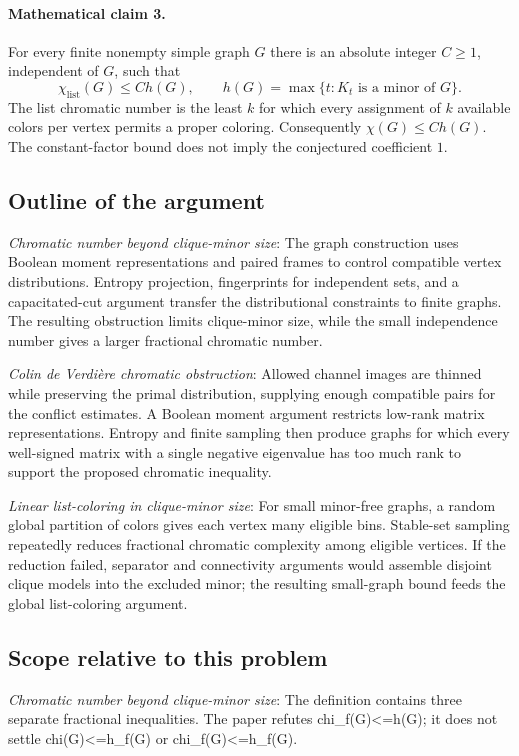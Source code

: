 \documentclass[11pt]{article}
\begin{document}
\paragraph{Mathematical claim 3.} For every finite nonempty simple graph $G$ there is an absolute integer $C\ge1$, independent of $G$, such that \[\chi_{\mathrm{list}}(G)\le C h(G),\qquad h(G)=\max\{t:K_t\text{ is a minor of }G\}.\] The list chromatic number is the least $k$ for which every assignment of $k$ available colors per vertex permits a proper coloring. Consequently $\chi(G)\le Ch(G)$. The constant-factor bound does not imply the conjectured coefficient $1$.

\subsection{Outline of the argument}
\textit{Chromatic number beyond clique-minor size}: The graph construction uses Boolean moment representations and paired frames to control compatible vertex distributions. Entropy projection, fingerprints for independent sets, and a capacitated-cut argument transfer the distributional constraints to finite graphs. The resulting obstruction limits clique-minor size, while the small independence number gives a larger fractional chromatic number.

\textit{Colin de Verdière chromatic obstruction}: Allowed channel images are thinned while preserving the primal distribution, supplying enough compatible pairs for the conflict estimates. A Boolean moment argument restricts low-rank matrix representations. Entropy and finite sampling then produce graphs for which every well-signed matrix with a single negative eigenvalue has too much rank to support the proposed chromatic inequality.

\textit{Linear list-coloring in clique-minor size}: For small minor-free graphs, a random global partition of colors gives each vertex many eligible bins. Stable-set sampling repeatedly reduces fractional chromatic complexity among eligible vertices. If the reduction failed, separator and connectivity arguments would assemble disjoint clique models into the excluded minor; the resulting small-graph bound feeds the global list-coloring argument.

\subsection{Scope relative to this problem}
\textit{Chromatic number beyond clique-minor size}: The definition contains three separate fractional inequalities. The paper refutes chi\_f(G)<=h(G); it does not settle chi(G)<=h\_f(G) or chi\_f(G)<=h\_f(G).
\end{document}
